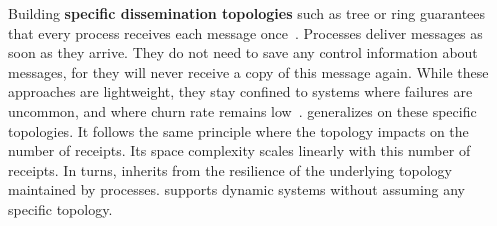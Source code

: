 Building \textbf{specific dissemination topologies} such as tree or ring
guarantees that every process receives each message
once~\cite{bravo2017saturn,raynal2013distributed}. Processes deliver messages as
soon as they arrive. They do not need to save any control information about
messages, for they will never receive a copy of this message again. While these
approaches are lightweight, they stay confined to systems where failures are
uncommon, and where churn rate remains
low~\cite{krasikova2016hashtable}. \RPCBROADCAST generalizes on these specific
topologies. It follows the same principle where the topology impacts on the
number of receipts. Its space complexity scales linearly with this number of
receipts. In turns, \RPCBROADCAST inherits from the resilience of the underlying
topology maintained by processes. \RPCBROADCAST supports dynamic systems without
assuming any specific topology.






